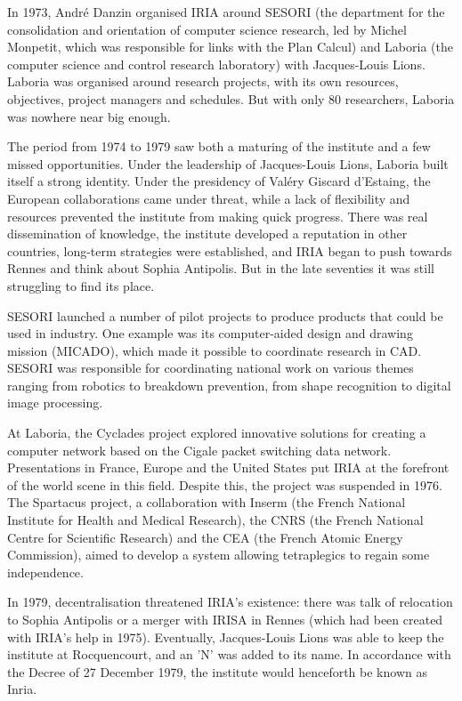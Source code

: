 In 1973, André Danzin organised IRIA around SESORI (the department for the consolidation and orientation of computer science research, led by Michel Monpetit, which was responsible for links with the Plan Calcul) and Laboria (the computer science and control research laboratory) with Jacques-Louis Lions. Laboria was organised around research projects, with its own resources, objectives, project managers and schedules. But with only 80 researchers, Laboria was nowhere near big enough.


The period from 1974 to 1979 saw both a maturing of the institute and a few missed opportunities. Under the leadership of Jacques-Louis Lions, Laboria built itself a strong identity. Under the presidency of Valéry Giscard d'Estaing, the European collaborations came under threat, while a lack of flexibility and resources prevented the institute from making quick progress. There was real dissemination of knowledge, the institute developed a reputation in other countries, long-term strategies were established, and IRIA began to push towards Rennes and think about Sophia Antipolis. But in the late seventies it was still struggling to find its place.


SESORI launched a number of pilot projects to produce products that could be used in industry. One example was its computer-aided design and drawing mission (MICADO), which made it possible to coordinate research in CAD. SESORI was responsible for coordinating national work on various themes ranging from robotics to breakdown prevention, from shape recognition to digital image processing.



At Laboria, the Cyclades project explored innovative solutions for creating a computer network based on the Cigale packet switching data network. Presentations in France, Europe and the United States put IRIA at the forefront of the world scene in this field. Despite this, the project was suspended in 1976. The Spartacus project, a collaboration with Inserm (the French National Institute for Health and Medical Research), the CNRS (the French National Centre for Scientific Research) and the CEA (the French Atomic Energy Commission), aimed to develop a system allowing tetraplegics to regain some independence.

In 1979, decentralisation threatened IRIA's existence: there was talk of relocation to Sophia Antipolis or a merger with IRISA in Rennes (which had been created with IRIA's help in 1975). Eventually, Jacques-Louis Lions was able to keep the institute at Rocquencourt, and an 'N' was added to its name. In accordance with the Decree of 27 December 1979, the institute would henceforth be known as Inria.



